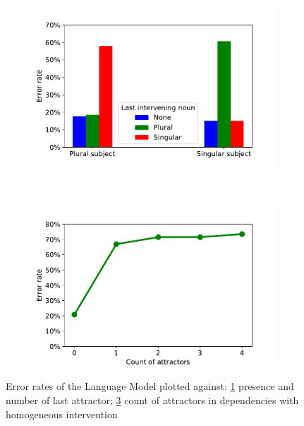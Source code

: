 \documentclass[twoside]{article}
\begin{document}
\begin{figure}
    \centering
    \begin{subfigure}[b]{0.4\textwidth}
    \caption{}
        \includegraphics[width=\textwidth]{2b.pdf}
        \label{fig:2b}
    \end{subfigure}
    ~ %
    \begin{subfigure}[b]{0.4\textwidth}
    	\caption{}
        \includegraphics[width=\textwidth]{2c.pdf}
        \label{fig:2c}
    \end{subfigure}
    \caption{Error rates of the Language Model plotted against: \ref{fig:2b} presence and number of last attractor; \ref{fig:2c} count of attractors in dependencies with homogeneous intervention}
\end{figure}
\end{document}

